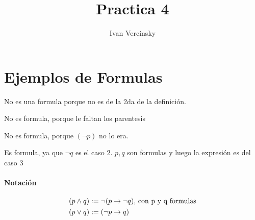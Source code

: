 \documentclass[14pt,a4paper,fleqn]{article}
\date{}
\author{Ivan Vercinsky}
\title{Practica 4}
\newcommand{\implica}[2]{(#1 \rightarrow #2)}
\newcommand{\entonces}{\rightarrow}
\newcommand{\no}[1]{\neg #1}
\newcommand{\conj}[2]{(#1 \wedge #2)}
\newcommand{\disj}[2]{(#1 \vee #2)}
\begin{document}
\maketitle

\section*{Ejemplos de Formulas}

\begin{description}[font=\bfseries]
\item[$(\neg p)$] No es una formula porque no es de la 2da de la definición.
\item[$p \entonces q $] No es formula, porque le faltan los parentesis
\item[$ \neg ( \neg p ) $] No es formula, porque $(\neg p)$ no lo era.
\item[$\implica{p}{\no{q}}$] Es formula, ya que $\neg q$ es el caso 2. $p, q$ son formulas y luego la expresión es del caso 3
\end{description}

\paragraph*{Notación}
\begin{align*}
	\conj{p}{q} &:= \no{\implica{p}{\no{q}}} \textnormal{, con p y q formulas} \\
	\disj{p}{q} &:= \implica{\no{p}}{q}
\end{align*}
\end{document}
